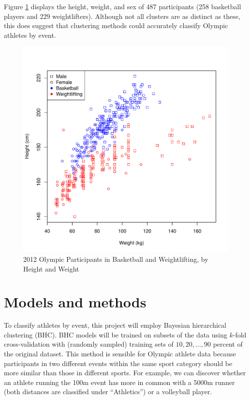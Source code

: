 \documentclass[twoside]{article}
\begin{document}
Figure \ref{bball-weight} displays the height, weight, and sex of 487 participants (258 basketball players and 229 weightlifters). Although not all clusters are as distinct as these, this does suggest that clustering methods could accurately classify Olympic athletes by event.

\begin{figure}
\begin{center}
\includegraphics[scale=0.5]{./project/Basketball-Weightlifting.pdf}
\caption{2012 Olympic Participants in Basketball and Weightlifting, by Height and Weight}
\label{bball-weight}
\end{center}
\end{figure}

\section{Models and methods}


To classify athletes by event, this project will employ Bayesian hierarchical clustering (BHC). BHC models will be trained on subsets of the data using $k$-fold cross-validation with (randomly sampled) training sets of $10,20,\ldots,90$ percent of the original dataset. This method is sensible for Olympic athlete data because participants in two different events within the same sport category should be more similar than those in different sports. For example, we can discover whether an athlete running the 100m event has more in common with a 5000m runner (both distances are classified under ``Athletics'') or a volleyball player.
\end{document}

